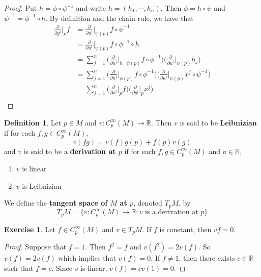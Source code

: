 \documentclass{book}
\theoremstyle{definition}
\newtheorem{defn}[definition]{Definition}
\newtheorem{ex}[definition]{Exercise}
\newcommand{\R}{\mathbb{R}}
\DeclareMathOperator*{\0}{\mbf{0}}
\DeclareMathOperator*{\1}{\mbf{1}}
\newcommand{\p}{\partial}
\begin{document}
	\begin{proof}
		Put $h = \phi \circ \psi^{-1}$ and write $h = (h_1, \cdots, h_n)$. Then $\phi = h \circ \psi$ and $\psi^{-1} = \phi^{-1} \circ h$. By definition and the chain rule, we have that 
		\begin{align*}
		\frac{\p}{\p y^i} \bigg|_p f 
			&= \frac{\p}{\p u^i} \bigg|_{\psi(p)} f \circ \psi^{-1} \\
			&= \frac{\p}{\p u^i} \bigg|_{\psi(p)} f \circ \phi^{-1} \circ h \\
			&= \sum_{j=1}^n \bigg(\frac{\p}{\p u^j} \bigg|_{h \circ \psi (p)} f \circ \phi^{-1} \bigg)  \bigg( \frac{\p}{\p u^i} \bigg|_{\psi(p)} h_j \bigg) \\
			&= \sum_{j=1}^n \bigg(\frac{\p}{\p u^j} \bigg|_{\phi (p)} f \circ \phi^{-1}  \bigg) \bigg( \frac{\p}{\p u^i} \bigg|_{\psi(p)} x^j \circ \psi^{-1} \bigg) \\
			&= \sum_{j=1}^n \bigg( \frac{\p}{\p x^i} \bigg|_p f \bigg)  \bigg(   \frac{\p}{\p y^i} \bigg|_p x^j  \bigg)\\
		\end{align*}
	\end{proof}

	\begin{defn}
		Let $p \in M$ and $v: C^{\infty}_p(M) \rightarrow \R$. Then $v$ is said to be \textbf{Leibnizian} if for each $f,g \in  C^{\infty}_p(M)$, $$v(fg) = v(f)g(p) + f(p)v(g)$$ and $v$ is said to be a \textbf{derivation at $p$} if for each $f, g \in C^{\infty}_p(M)$ and $a \in \R$,
		\begin{enumerate}
			\item $v$ is linear 
			\item $v$ is Leibnizian
		\end{enumerate}
		We define the \textbf{tangent space of $M$ at $p$}, denoted $T_pM$, by $$T_pM = \{ v: C^{\infty}_p(M) \rightarrow \R: v \text{ is a derivation at }p\}$$
	\end{defn}

	\begin{ex}
		Let $f \in C^{\infty}_p(M)$ and $v \in T_pM$. If $f$ is constant, then $vf = 0$.
	\end{ex}

	\begin{proof}
		Suppose that $f = 1$. Then $f^2 = f$ and $v(f^2) = 2v(f)$. So $v(f) = 2v(f)$ which implies that $v(f) = 0$. If $f \neq 1$, then there exists $c \in \R$ such that $f = c$. Since $v$ is linear, $v(f) = cv(1) = 0$.
	\end{proof}
\end{document}
